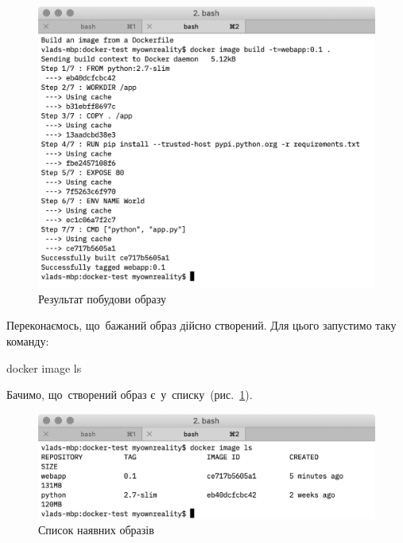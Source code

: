 \documentclass[
	a4paper,
	oneside,
	BCOR = 10mm,
	DIV = 12,
	12pt,
	headings = normal,
]{scrartcl}
\newlength{\gridunitwidth}
\begin{document}
					\begin{figure}[!htbp]
						\centering
						\includegraphics[width=10\gridunitwidth]{./assets/y03s02-syssoft-homework-01-p01.png}
						\caption{Результат побудови образу}
						\label{fig:docker-image-build-res}
					\end{figure}
					
					Переконаємось, що~бажаний образ дійсно створений. Для цього запустимо таку команду:
					\begin{bashterm}
						docker image ls
					\end{bashterm}
					Бачимо, що~створений образ є~у~списку~(рис.~\ref{fig:docker-image-build-res}).

					\begin{figure}[!htbp]
						\centering
						\includegraphics[width=10\gridunitwidth]{./assets/y03s02-syssoft-homework-01-p02.png}
						\caption{Список наявних образів}
						\label{fig:docker-image-ls-res}
					\end{figure}
\end{document}
